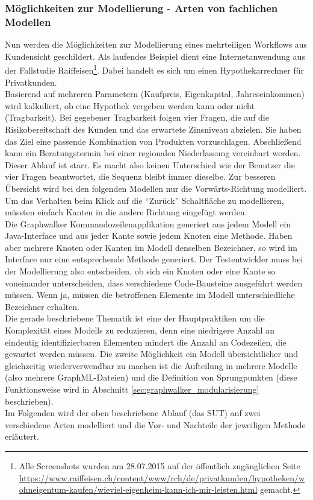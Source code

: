 \subsubsection{Möglichkeiten zur Modellierung - Arten von fachlichen Modellen}
\label{sec:results_modellierung}
Nun werden die Möglichkeiten zur Modellierung eines mehrteiligen Workflows aus Kundensicht geschildert. Als laufendes Beispiel dient eine Internetanwendung aus der Fallstudie Raiffeisen\footnote{Alle Screenshots wurden am 28.07.2015 auf der öffentlich zugänglichen Seite \url{https://www.raiffeisen.ch/content/www/rch/de/privatkunden/hypotheken/wohneigentum-kaufen/wieviel-eigenheim-kann-ich-mir-leisten.html} gemacht.}. Dabei handelt es sich um einen Hypothekarrechner für Privatkunden.\\
Basierend auf mehreren Parametern (Kaufpreis, Eigenkapital, Jahreseinkommen) wird kalkuliert, ob eine Hypothek vergeben werden kann oder nicht (Tragbarkeit). Bei gegebener Tragbarkeit folgen vier Fragen, die auf die Risikobereitschaft des Kunden und das erwartete Zinsniveau abzielen. Sie haben das Ziel eine passende Kombination von Produkten vorzuschlagen. Abschließend kann ein Beratungstermin bei einer regionalen Niederlassung vereinbart werden.\\
Dieser Ablauf ist starr. Es macht also keinen Unterschied wie der Benutzer die vier Fragen beantwortet, die Sequenz bleibt immer dieselbe. Zur besseren Übersicht wird bei den folgenden Modellen nur die Vorwärts-Richtung modelliert. Um das Verhalten beim Klick auf die ``Zurück'' Schaltfläche zu modellieren, müssten einfach Kanten in die andere Richtung eingefügt werden.\\
Die Graphwalker Kommandozeilenapplikation generiert aus jedem Modell ein Java-Interface und aus jeder Kante sowie jedem Knoten eine Methode. Haben aber mehrere Knoten oder Kanten im Modell denselben Bezeichner, so wird im Interface nur eine entsprechende Methode generiert. Der Testentwickler muss bei der Modellierung also entscheiden, ob sich ein Knoten oder eine Kante so voneinander unterscheiden, dass verschiedene Code-Bausteine ausgeführt werden müssen. Wenn ja, müssen die betroffenen Elemente im Modell unterschiedliche Bezeichner erhalten.\\
Die gerade beschriebene Thematik ist eine der Hauptpraktiken um die Komplexität eines Modells zu reduzieren, denn eine niedrigere Anzahl an eindeutig identifizierbaren Elementen mindert die Anzahl an Codezeilen, die gewartet werden müssen. Die zweite Möglichkeit ein Modell übersichtlicher und gleichzeitig wiederverwendbar zu machen ist die Aufteilung in mehrere Modelle (also mehrere GraphML-Dateien) und die Definition von Sprungpunkten (diese Funktionsweise wird in Abschnitt \ref{sec:graphwalker_modularisierung} beschrieben).\\
Im Folgenden wird der oben beschriebene Ablauf (das \Gls{SUT}) auf zwei verschiedene Arten modelliert und die Vor- und Nachteile der jeweiligen Methode erläutert.


